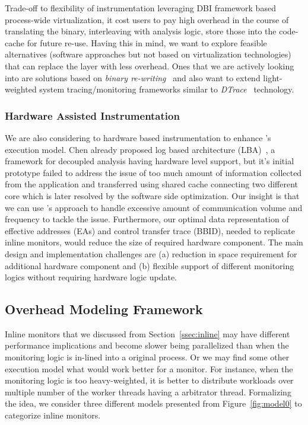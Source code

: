 Trade-off to flexibility of instrumentation leveraging DBI framework based
process-wide virtualization, it cost users to pay high overhead in the course
of translating the binary, interleaving with analysis logic, store those into
the code-cache for future re-use. Having this in mind, we want to explore
feasible alternatives (software approaches but not based on virtualization
technologies) that can replace the layer with less overhead. Ones that we are
actively looking into are solutions based on {\it binary re-writing}~\cite{cfi,
brewriting:usenix2003} and also want to extend light-weighted system
tracing/monitoring frameworks similar to {\it DTrace}~\cite{DTrace} technology.

\subsubsection{Hardware Assisted Instrumentation} 
\label{ssec:hw_inst}

We are also considering to hardware based instrumentation to enhance
\sreplica's execution model. Chen \etal already proposed log based architecture
(LBA)~\cite{lba:isca2008}, a framework for decoupled analysis having hardware
level support, but it's initial prototype failed to address the issue of too
much amount of information collected from the application and transferred using
shared cache connecting two different core which is later resolved by the
software side optimization. 
%
Our insight is that we can use \sreplica's approach to handle excessive amount
of communication volume and frequency to tackle the issue. Furthermore, our
optimal data representation of effective addresses (EAs) and control transfer
trace (BBID), needed to replicate inline monitors, would reduce the size of
required hardware component.
%
The main design and implementation challenges are (a) reduction in space
requirement for additional hardware component and (b) flexible support of
different monitoring logics without requiring hardware logic update.

\subsection{Overhead Modeling Framework}

Inline monitors that we discussed from Section~\ref{ssec:inline} may have
different performance implications and become slower being parallelized than
when the monitoring logic is in-lined into a original process. Or we may find
some other execution model what would work better for a monitor. For instance,
when the monitoring logic is too heavy-weighted, it is better to distribute
workloads over multiple number of the worker threads having a arbitrator
thread. Formalizing the idea, we consider three different models presented from
Figure~\ref{fig:model0} to categorize inline monitors.

